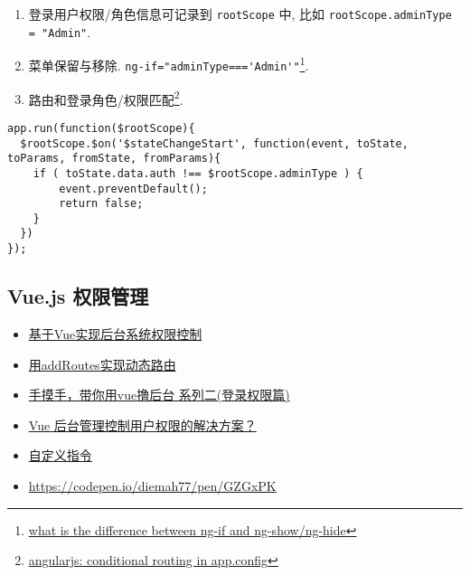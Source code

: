 \begin{enumerate}
\def\labelenumi{\arabic{enumi}.}
\setcounter{enumi}{1}
\tightlist
\item
  登录用户权限/角色信息可记录到 \lstinline!rootScope! 中, 比如
  \lstinline!rootScope.adminType = "Admin"!.
\item
  菜单保留与移除. \lstinline!ng-if="adminType==='Admin'"!\footnote{\href{http://stackoverflow.com/questions/19177732/what-is-the-difference-between-ng-if-and-ng-show-ng-hide}{what
    is the difference between ng-if and ng-show/ng-hide}}.
\item
  路由和登录角色/权限匹配\footnote{\href{http://stackoverflow.com/questions/20978248/angularjs-conditional-routing-in-app-config}{angularjs:
    conditional routing in app.config}}.
\end{enumerate}

\begin{lstlisting}
app.run(function($rootScope){
  $rootScope.$on('$stateChangeStart', function(event, toState, toParams, fromState, fromParams){
    if ( toState.data.auth !== $rootScope.adminType ) {
        event.preventDefault();
        return false;
    }
  })
});
\end{lstlisting}

\subsection{Vue.js 权限管理}\label{vue.js-ux6743ux9650ux7ba1ux7406}

\begin{itemize}
\tightlist
\item
  \href{http://refined-x.com/2017/08/29/\%E5\%9F\%BA\%E4\%BA\%8EVue\%E5\%AE\%9E\%E7\%8E\%B0\%E5\%90\%8E\%E5\%8F\%B0\%E7\%B3\%BB\%E7\%BB\%9F\%E6\%9D\%83\%E9\%99\%90\%E6\%8E\%A7\%E5\%88\%B6/}{基于Vue实现后台系统权限控制}
\item
  \href{http://refined-x.com/2017/09/01/\%E7\%94\%A8addRoutes\%E5\%AE\%9E\%E7\%8E\%B0\%E5\%8A\%A8\%E6\%80\%81\%E8\%B7\%AF\%E7\%94\%B1/}{用addRoutes实现动态路由}
\item
  \href{https://juejin.im/post/591aa14f570c35006961acac}{手摸手，带你用vue撸后台
  系列二(登录权限篇)}
\item
  \href{https://www.zhihu.com/question/58991978}{Vue
  后台管理控制用户权限的解决方案？}
\item
  \href{https://cn.vuejs.org/v2/guide/custom-directive.html}{自定义指令}
\item
  \url{https://codepen.io/diemah77/pen/GZGxPK}
\end{itemize}

